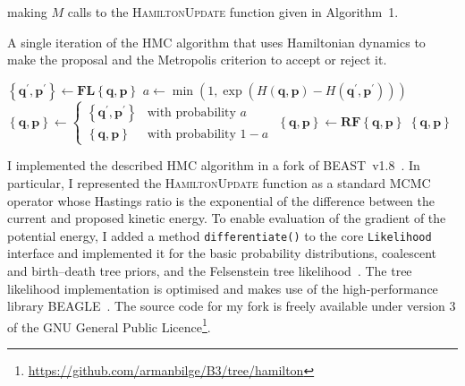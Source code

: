 \documentclass{article}
\renewcommand{\vec}[1]{\ensuremath{\boldsymbol{\mathbf{#1}}}}
\newcommand{\op}[1]{\ensuremath{\boldsymbol{\mathbf{#1}}}}
\begin{document}
        making $M$ calls to the \textsc{HamiltonUpdate} function given in
        Algorithm~1.
    \begin{algorithm}
        \caption{A single iteration of the \acl{HMC} algorithm that uses
                 Hamiltonian dynamics to make the proposal and the Metropolis
                 criterion to accept or reject it.}
        \begin{algorithmic}[1]
        \Function {HamiltonUpdate}{$\left\{\vec{q},\vec{p}\right\}$}
            \State $\left\{\vec{q}^\prime, \vec{p}^\prime\right\}
                \leftarrow \op{F}\op{L}\left\{\vec{q},\vec{p}\right\}$
            \State $a \leftarrow \min\left(1,
                \exp\left(
                    H\left(\vec{q}, \vec{p}\right) - H\left(\vec{q}^\prime,
                        \vec{p}^\prime\right)\right)\right)$
            \State $\left\{\vec{q},\vec{p}\right\} \leftarrow
                \begin{cases}
                    \left\{\vec{q}^\prime, \vec{p}^\prime\right\}
                        & \text{with probability } a \\
                    \left\{\vec{q},\vec{p}\right\}
                        & \text{with probability } 1 - a
                \end{cases}$
            \State $\left\{\vec{q},\vec{p}\right\} \leftarrow
                        \op{R}\op{F}\left\{\vec{q},\vec{p}\right\}$
            \State \Return $\left\{\vec{q},\vec{p}\right\}$
        \EndFunction
        \end{algorithmic}
    \end{algorithm}

    I implemented the described \ac{HMC} algorithm in a fork of
        BEAST~v1.8~\cite{Dru+12}.
    In particular, I represented the \textsc{HamiltonUpdate} function as a
        standard \ac{MCMC} operator whose Hastings ratio is the exponential of
        the difference between the current and proposed kinetic energy.
    To enable evaluation of the gradient of the potential energy, I added a
        method \texttt{differentiate()} to the core \texttt{Likelihood}
        interface and implemented it for the basic probability distributions,
        coalescent and birth--death tree priors, and the Felsenstein tree
        likelihood~\cite{Fel81}.
    The tree likelihood implementation is optimised and makes use of the
        high-performance library BEAGLE~\cite{Ayr+12}.
    The source code for my fork is freely available under version 3 of the GNU
        General Public
        Licence\footnote{\url{https://github.com/armanbilge/B3/tree/hamilton}}.
\end{document}
